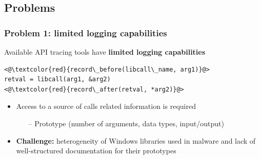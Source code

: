 \documentclass[compress]{beamer}
\begin{document}

\subsection{Problems}
\begin{frame}[fragile]
    \frametitle{Problem 1: limited logging capabilities}

Available API tracing tools have \textbf{limited logging capabilities}
\medskip
	\begin{block}{}
\begin{lstlisting}[basicstyle=\ttfamily\large,xleftmargin=50pt]
<@\textcolor{red}{record\_before(libcall\_name, arg1)}@> 
retval = libcall(arg1, &arg2)
<@\textcolor{red}{record\_after(retval, *arg2)}@> 
\end{lstlisting}
\end{block}	
\medskip
\begin{itemize}
\item Access to a source of calls related information is required
\begin{itemize}
\item[--] Prototype (number of arguments, data types, input/output)
\end{itemize}
\medskip
\item \textbf{Challenge:} heterogeneity of Windows libraries used in malware and lack of well-structured documentation for their prototypes
\end{itemize}
	
\end{frame}
\end{document}
